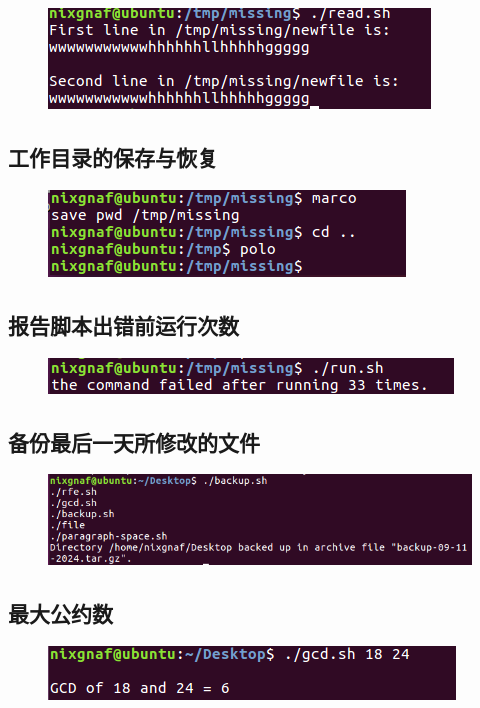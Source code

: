 \documentclass{article}
\begin{document}
\begin{figure}[h]
    \centering
    \includegraphics[width=0.5\linewidth]{image1.png}
\end{figure}

\subsection{工作目录的保存与恢复}

\begin{figure}[h]
    \centering
    \includegraphics[width=0.5\linewidth]{image2.png}
\end{figure}

\subsection{报告脚本出错前运行次数}



\begin{figure}[h]
    \centering
    \includegraphics[width=0.5\linewidth]{image3.png}
\end{figure}

\subsection{备份最后一天所修改的文件}

\begin{figure}[h]
    \centering
    \includegraphics[width=0.5\linewidth]{image7.png}
\end{figure}

\subsection{最大公约数}

\begin{figure}[h]
    \centering
    \includegraphics[width=0.5\linewidth]{image4.png}
\end{figure}
\end{document}
